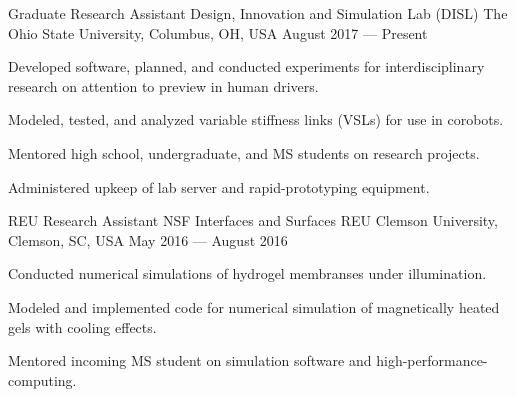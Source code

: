 

\begin{cventries}

  \cventry
    {Graduate Research Assistant} %
    {Design, Innovation and Simulation Lab (DISL)} %
    {The Ohio State University, Columbus, OH, USA} %
    {August 2017 --- Present} %
    {
      \begin{cvitems} %
        \item{Developed software, planned, and conducted experiments for interdisciplinary research on attention to preview in human drivers.}
        \item{Modeled, tested, and analyzed variable stiffness links (VSLs) for use in corobots.}
        \item{Mentored high school, undergraduate, and MS students on research projects.}
        \item{Administered upkeep of lab server and rapid-prototyping equipment.}
      \end{cvitems}
    }

  \cventry
    {REU Research Assistant} %
    {NSF Interfaces and Surfaces REU} %
    {Clemson University, Clemson, SC, USA} %
    {May 2016 --- August 2016} %
    {
      \begin{cvitems} %
        \item {Conducted numerical simulations of hydrogel membranses under illumination.}
        \item {Modeled and implemented code for numerical simulation of magnetically heated gels with cooling effects.}
        \item {Mentored incoming MS student on simulation software and high-performance-computing.}
      \end{cvitems}
    }


\end{cventries}
